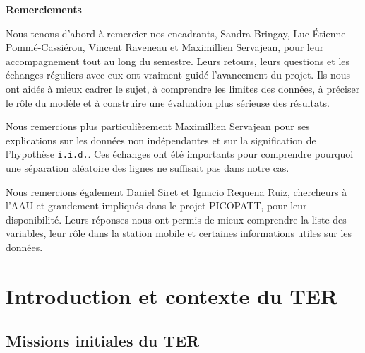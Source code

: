 \documentclass{article}
\begin{document}
\newpage
\thispagestyle{empty}
\vspace*{3cm}
\begin{center}
{\Large \textbf{Remerciements}}
\end{center}

\vspace{1cm}
Nous tenons d'abord à remercier nos encadrants, Sandra Bringay, Luc Étienne Pommé-Cassiérou, Vincent Raveneau et Maximillien Servajean, pour leur accompagnement tout au long du semestre. Leurs retours, leurs questions et les échanges réguliers avec eux ont vraiment guidé l'avancement du projet. Ils nous ont aidés à mieux cadrer le sujet, à comprendre les limites des données, à préciser le rôle du modèle et à construire une évaluation plus sérieuse des résultats.

Nous remercions plus particulièrement Maximillien Servajean pour ses explications sur les données non indépendantes et sur la signification de l'hypothèse \texttt{i.i.d.}. Ces échanges ont été importants pour comprendre pourquoi une séparation aléatoire des lignes ne suffisait pas dans notre cas.

Nous remercions également Daniel Siret et Ignacio Requena Ruiz, chercheurs à l'AAU et grandement impliqués dans le projet PICOPATT, pour leur disponibilité. Leurs réponses nous ont permis de mieux comprendre la liste des variables, leur rôle dans la station mobile et certaines informations utiles sur les données.

\newpage
\hypersetup{pageanchor=true}
\setcounter{page}{1}
\tableofcontents
\newpage

\section{Introduction et contexte du TER}

\subsection{Missions initiales du TER}
\end{document}
